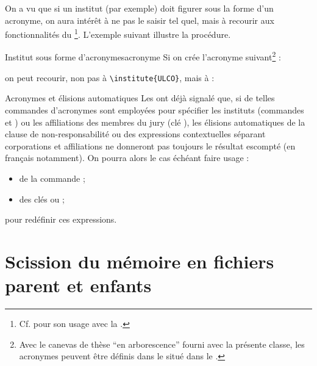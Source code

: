 On a vu  que si un institut (par exemple) doit figurer
sous la forme d'un acronyme, on aura intérêt à ne pas le saisir tel
quel, mais à recourir aux fonctionnalités du
\footnote{Cf.  pour
  son usage avec la \yatCl{}.}. L'exemple suivant illustre la
procédure.
%
\begin{dbexample}{Institut sous forme d'acronymes}{acronyme}
  Si on crée l'acronyme suivant\footnote{Avec le canevas de thèse \enquote{en
      arborescence} fourni avec la présente classe, les acronymes peuvent être
    définis dans le \File{\acronymsfile} situé dans le
    \Folder{\auxiliarydirectory}.} :
\begin{preamblecode}[listing options={moretexcs={newacronym}}]
\end{preamblecode}
on peut recourir, non pas à \lstinline[deletekeywords={[5]institute}]|\institute{ULCO}|, mais à :
\begin{preamblecode}[listing options={deletekeywords={[5]institute}}]
\end{preamblecode}
\end{dbexample}

\begin{dbremark}{Acronymes et élisions automatiques}{}
  Les  ont déjà
  signalé que, si de telles commandes d'acronymes sont employées pour spécifier
  les instituts (commandes  et ) ou les
  affiliations des membres du jury (clé ), les élisions
  automatiques de la clause de non-responsabilité ou des expressions
  contextuelles séparant corporations et affiliations ne donneront pas toujours le
  résultat escompté (en français notamment). On pourra alors le cas échéant
  faire usage :
  \begin{itemize}
  \item de la commande  ;
  \item des clés  ou  ;
  \end{itemize}
  pour redéfinir ces expressions.
\end{dbremark}

\section{Scission du mémoire en fichiers parent et enfants}
\label{sec-repart-du-memo}

